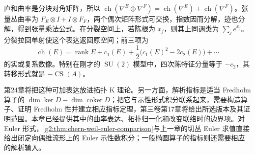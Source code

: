 \ProseParagraphBreak

直和曲率是分块对角矩阵，所以 \(\operatorname{ch}(\nabla^E\oplus\nabla^F)=\operatorname{ch}(\nabla^E)+\operatorname{ch}(\nabla^F)\)。张量丛曲率为 \(F_E\otimes I+I\otimes F_F\)，两个偶次矩阵形式可交换，指数因而分解，迹也分解，得到张量乘法公式。在分裂空间上，若陈根为 \(x_j\)，则其上同调类为 \(\sum_j e^{x_j}\)。分裂拉回单射使这个表达返回原空间；前三项为
\[
	\operatorname{ch}(E)=\operatorname{rank}E+c_1(E)+\frac12\bigl(c_1(E)^2-2c_2(E)\bigr)+\cdots
\]
的实或复系数像。特别在刚才的 \(\operatorname{SU}(2)\) 模型中，四次陈特征分量等于 \(-c_2\)，其转移形式就是 \(-\operatorname{CS}(A)\)。

\ProseParagraphBreak

第24章将把这种可加表达放进拓扑 K 理论。另一方面，解析指标是适当 Fredholm 算子的 \(\dim\ker D-\dim\operatorname{coker}D\)；把它与示性形式积分联系起来，需要构造算子、证明 Fredholm 性并建立相应指标定理，第三卷第17章将给出所选版本及其证明范围。本章已经提供其中的曲率表达、拓扑归一化和改变联络时的边界项。对 Euler 形式，\cref{g2:thm:chern-weil-euler-comparison}与上一章的切丛 Euler 求值直接给出闭定向偶维流形上的 Euler 示性数积分；一般椭圆算子的指标则还需要相应的解析输入。
